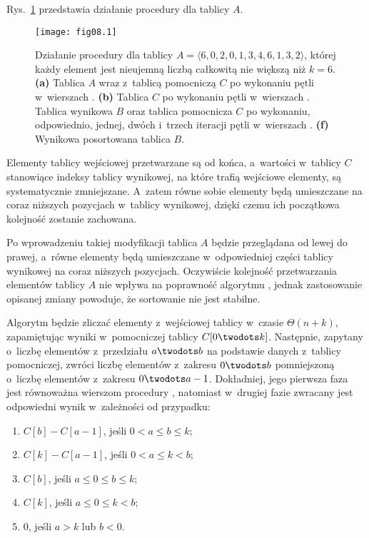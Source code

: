
\exercise %
Rys.~\ref{fig:8.2-1} przedstawia działanie procedury  dla tablicy $A$.
\begin{figure}[ht]
	\begin{center}
		\texttt{[image: fig08.1]}
	\end{center}
	\caption{Działanie procedury  dla tablicy $A=\langle6,0,2,0,1,3,4,6,1,3,2\rangle$, której każdy element jest nieujemną liczbą całkowitą nie większą niż $k=6$. {\sffamily\bfseries(a)} Tablica $A$ wraz z~tablicą pomocniczą $C$ po wykonaniu pętli w~wierszach . {\sffamily\bfseries(b)} Tablica $C$ po wykonaniu pętli w~wierszach . {\sffamily\bfseries{}} Tablica wynikowa $B$ oraz tablica pomocnicza $C$ po wykonaniu, odpowiednio, jednej, dwóch i~trzech iteracji pętli  w~wierszach . {\sffamily\bfseries(f)} Wynikowa posortowana tablica $B$.} \label{fig:8.2-1}
\end{figure}

\exercise %
Elementy tablicy wejściowej przetwarzane są od końca, a~wartości w~tablicy $C$ stanowiące indeksy tablicy wynikowej, na które trafią wejściowe elementy, są systematycznie zmniejszane. A~zatem równe sobie elementy będą umieszczane na coraz niższych pozycjach w~tablicy wynikowej, dzięki czemu ich początkowa kolejność zostanie zachowana.

\exercise %
Po wprowadzeniu takiej modyfikacji tablica $A$ będzie przeglądana od lewej do prawej, a~równe elementy będą umieszczane w~odpowiedniej części tablicy wynikowej na coraz niższych pozycjach. Oczywiście kolejność przetwarzania elementów tablicy $A$ nie wpływa na poprawność algorytmu , jednak zastosowanie opisanej zmiany powoduje, że sortowanie nie jest stabilne.

\exercise %
Algorytm będzie zliczać elementy z~wejściowej tablicy w~czasie $\Theta(n+k)$, zapamiętując wyniki w~pomocniczej tablicy $C[0\twodots k]$. Następnie, zapytany o~liczbę elementów z~przedziału $a\twodots b$ na podstawie danych z~tablicy pomocniczej, zwróci liczbę elementów z~zakresu $0\twodots b$ pomniejszoną o~liczbę elementów z~zakresu $0\twodots a-1$. Dokładniej, jego pierwsza faza jest równoważna wierszom  procedury , natomiast w~drugiej fazie zwracany jest odpowiedni wynik w~zależności od przypadku:
\begin{enumerate}
	\renewcommand{\labelenumi}{(\roman{enumi})}
	\item $C[b]-C[a-1]$, jeśli $0<a\le b\le k$;
	\item $C[k]-C[a-1]$, jeśli $0<a\le k<b$;
	\item $C[b]$, jeśli $a\le0\le b\le k$;
	\item $C[k]$, jeśli $a\le0\le k<b$;
	\item 0, jeśli $a>k$ lub $b<0$.
\end{enumerate}

